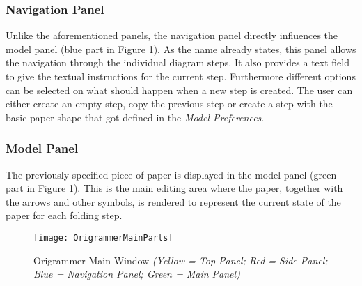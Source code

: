 \subsubsection*{Navigation Panel}
Unlike the aforementioned panels, the navigation panel directly influences the model panel (blue part in Figure \ref{fig:origrammerMain}). As the name already states, this panel allows the navigation through the individual diagram steps. It also provides a text field to give the textual instructions for the current step. Furthermore different options can be selected on what should happen when a new step is created. The user can either create an empty step, copy the previous step or create a step with the basic paper shape that got defined in the \emph{Model Preferences}.

\subsubsection*{Model Panel}
The previously specified piece of paper is displayed in the model panel (green part in Figure \ref{fig:origrammerMain}). This is the main editing area where the paper, together with the arrows and other symbols, is rendered to represent the current state of the paper for each folding step.
\begin{figure}[htbp]
	\centering
	\texttt{[image: OrigrammerMainParts]}
	\caption{Origrammer Main Window \emph{(Yellow = Top Panel; Red = Side Panel; Blue = Navigation Panel; Green = Main Panel)}}
	\label{fig:origrammerMain}
\end{figure}